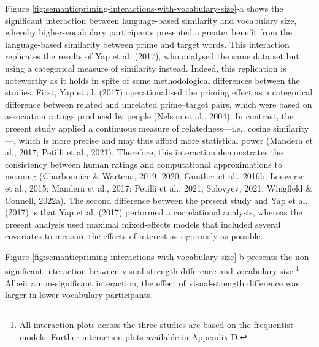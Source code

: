 \documentclass[
  12pt,
  man,floatsintext]{apa7}
\begin{document}
Figure \ref{fig:semanticpriming-interactions-with-vocabulary-size}-a shows the significant interaction between language-based similarity and vocabulary size, whereby higher-vocabulary participants presented a greater benefit from the language-based similarity between prime and target words. This interaction replicates the results of Yap et al. (2017), who analysed the same data set but using a categorical measure of similarity instead. Indeed, this replication is noteworthy as it holds in spite of some methodological differences between the studies. First, Yap et al. (2017) operationalised the priming effect as a categorical difference between related and unrelated prime--target pairs, which were based on association ratings produced by people (Nelson et al., 2004). In contrast, the present study applied a continuous measure of relatedness---i.e., cosine similarity---, which is more precise and may thus afford more statistical power (Mandera et al., 2017; Petilli et al., 2021). Therefore, this interaction demonstrates the consistency between human ratings and computational approximations to meaning (Charbonnier \& Wartena, 2019, 2020; Günther et al., 2016b; Louwerse et al., 2015; Mandera et al., 2017; Petilli et al., 2021; Solovyev, 2021; Wingfield \& Connell, 2022a). The second difference between the present study and Yap et al. (2017) is that Yap et al. (2017) performed a correlational analysis, whereas the present analysis used maximal mixed-effects models that included several covariates to measure the effects of interest as rigorously as possible.

Figure \ref{fig:semanticpriming-interactions-with-vocabulary-size}-b presents the non-significant interaction between visual-strength difference and vocabulary size.\footnote{All interaction plots across the three studies are based on the frequentist models. Further interaction plots available in \protect\hyperlink{appendix-D-interaction-plots}{\underline{Appendix D}}.} Albeit a non-significant interaction, the effect of visual-strength difference was larger in lower-vocabulary participants.
\end{document}
